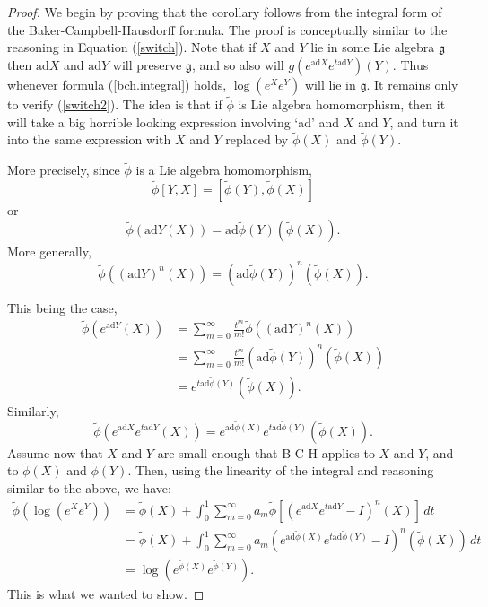 \documentclass{amsbook}
\let \frak = \mathfrak
\theoremstyle{plain}
\numberwithin{equation}{chapter}
\numberwithin{theorem}{chapter}
\begin{document}
\begin{proof}
We begin by proving that the corollary follows from the integral form of the
Baker-Campbell-Hausdorff formula. The proof is conceptually similar to the
reasoning in Equation (\ref{switch}). Note that if $X$ and $Y$ lie in some Lie
algebra $\frak{g}$ then $\mathrm{ad}X$ and $\mathrm{ad}Y$ will preserve
$\frak{g}$, and so also will $g(e^{\mathrm{ad}X}e^{t\mathrm{ad}Y})(Y)$. Thus
whenever formula (\ref{bch.integral}) holds, $\log\left(  e^{X}e^{Y}\right)  $
will lie in $\frak{g}$. It remains only to verify (\ref{switch2}). The idea is
that if $\widetilde{\phi}$ is Lie algebra homomorphism, then it will take a
big horrible looking expression involving `ad' and $X$ and $Y$, and turn it
into the same expression with $X$ and $Y$ replaced by $\widetilde{\phi}\left(
X\right)  $ and $\widetilde{\phi}\left(  Y\right)  $.

More precisely, since $\widetilde{\phi}$ is a Lie algebra homomorphism,
\[
\widetilde{\phi}[Y,X]=[\widetilde{\phi}(Y),\widetilde{\phi}(X)]
\]
or
\[
\widetilde{\phi}\left(  \mathrm{ad}Y\left(  X\right)  \right)  =\mathrm{ad}%
\widetilde{\phi}\left(  Y\right)  \left(  \widetilde{\phi}\left(  X\right)
\right)  \text{.}%
\]
More generally,
\[
\widetilde{\phi}\left(  \left(  \mathrm{ad}Y\right)  ^{n}\left(  X\right)
\right)  =\left(  \mathrm{ad}\widetilde{\phi}\left(  Y\right)  \right)
^{n}\left(  \widetilde{\phi}\left(  X\right)  \right)  \text{.}%
\]

This being the case,
\begin{align*}
\widetilde{\phi}\left(  e^{\mathrm{ad}Y}\left(  X\right)  \right)    &
=\sum_{m=0}^{\infty}\frac{t^{m}}{m!}\widetilde{\phi}\left(  \left(
\mathrm{ad}Y\right)  ^{n}\left(  X\right)  \right)  \\
& =\sum_{m=0}^{\infty}\frac{t^{m}}{m!}\left(  \mathrm{ad}\widetilde{\phi
}\left(  Y\right)  \right)  ^{n}\left(  \widetilde{\phi}\left(  X\right)
\right)  \\
& =e^{t\mathrm{ad}\widetilde{\phi}(Y)}\left(  \widetilde{\phi}(X)\right)
\text{.}%
\end{align*}
Similarly,
\[
\widetilde{\phi}\left(  e^{\mathrm{ad}X}e^{t\mathrm{ad}Y}(X)\right)
=e^{\mathrm{ad}\widetilde{\phi}(X)}e^{t\mathrm{ad}\widetilde{\phi}(Y)}\left(
\widetilde{\phi}(X)\right)  \text{.}%
\]
Assume now that $X$ and $Y$ are small enough that B-C-H applies to $X$ and
$Y$, and to $\widetilde{\phi}(X)$ and $\widetilde{\phi}(Y)$. Then, using the
linearity of the integral and reasoning similar to the above, we have:
\begin{align*}
\widetilde{\phi}\left(  \log\left(  e^{X}e^{Y}\right)  \right)    &
=\widetilde{\phi}(X)+\int_{0}^{1}\sum_{m=0}^{\infty}a_{m}\widetilde{\phi
}\left[  \left(  e^{\mathrm{ad}X}e^{t\mathrm{ad}Y}-I\right)  ^{n}(X)\right]
\,dt\\
& =\widetilde{\phi}(X)+\int_{0}^{1}\sum_{m=0}^{\infty}a_{m}\left(
e^{\mathrm{ad}\widetilde{\phi}(X)}e^{t\mathrm{ad}\widetilde{\phi}%
(Y)}-I\right)  ^{n}(\widetilde{\phi}(X))\,dt\\
& =\log\left(  e^{\widetilde{\phi}(X)}e^{\widetilde{\phi}(Y)}\right)  \text{.}%
\end{align*}
This is what we wanted to show.
\end{proof}
\end{document}
